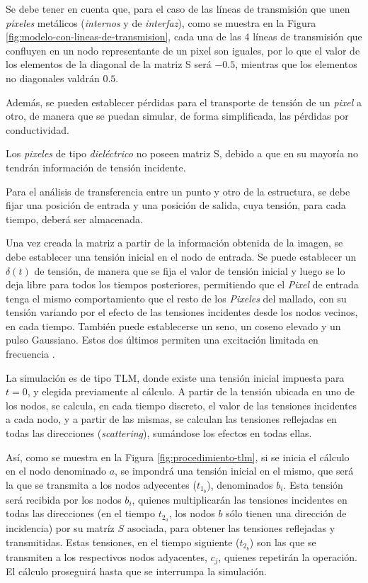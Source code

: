 \begin{enumerate}
	Se debe tener en cuenta que, para el caso de las líneas de transmisión que unen \textit{pixeles} metálicos (\textit{internos} y de \textit{interfaz}), como se muestra en la Figura \ref{fig:modelo-con-lineas-de-transmision}, cada una de las 4 líneas de transmisión que confluyen en un nodo representante de un pixel son iguales, por lo que el valor de los elementos de la diagonal de la matriz S será $-0.5$, mientras que los elementos no diagonales valdrán $0.5$.
	
	Además, se pueden establecer pérdidas para el transporte de tensión de un \textit{pixel} a otro, de manera que se puedan simular, de forma simplificada, las pérdidas por conductividad.
	
	Los \textit{pixeles} de tipo \textit{dieléctrico} no poseen matriz S, debido a que en su mayoría no tendrán información de tensión incidente.
\end{enumerate}


Para el análisis de transferencia entre un punto y otro de la estructura, se debe fijar una posición de entrada y una posición de salida, cuya tensión, para cada tiempo, deberá ser almacenada.

Una vez creada la matriz a partir de la información obtenida de la imagen, se debe establecer una tensión inicial en el nodo de entrada. Se puede establecer un $\delta(t)$ de tensión, de manera que se fija el valor de tensión inicial y luego se lo deja libre para todos los tiempos posteriores, permitiendo que el \textit{Pixel} de entrada tenga el mismo comportamiento que el resto de los \textit{Pixeles} del mallado, con su tensión variando por el efecto de las tensiones incidentes desde los nodos vecinos, en cada tiempo. También puede establecerse un seno, un coseno elevado y un pulso Gaussiano. Estos dos últimos permiten una excitación limitada en frecuencia \cite{Barthia:Handbook}.

La simulación es de tipo TLM, donde existe una tensión inicial impuesta para $t=0$, y elegida previamente al cálculo. A partir de la tensión ubicada en uno de los nodos, se calcula, en cada tiempo discreto, el valor de las tensiones incidentes a cada nodo, y a partir de las mismas, se calculan las tensiones reflejadas en todas las direcciones (\textit{scattering}), sumándose los efectos en todas ellas.

Así, como se muestra en la Figura \ref{fig:procedimiento-tlm}, si se inicia el cálculo en el nodo denominado $a$, se impondrá una tensión inicial en el mismo, que será la que se transmita a los nodos adyecentes ($t_{1_b}$), denominados $b_i$. Esta tensión será recibida por los nodos $b_i$, quienes multiplicarán las tensiones incidentes en todas las direcciones (en el tiempo $t_{2_a}$, los nodos $b$ sólo tienen una dirección de incidencia) por su matríz $S$ asociada, para obtener las tensiones reflejadas y transmitidas. Estas tensiones, en el tiempo siguiente ($t_{2_b}$) son las que se transmiten a los respectivos nodos adyacentes, $c_j$, quienes repetirán la operación. El cálculo proseguirá hasta que se interrumpa la simulación.

